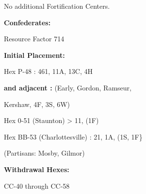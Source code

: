 \begin{scenariodata}
No additional Fortification Centers.\\
\end{scenariodata}

\begin{scenariodata}
\textbf{Confederates:}\\
\end{scenariodata}

\begin{scenariodata}
Resource Factor 714\\
\end{scenariodata}

\begin{scenariodata}
\textbf{Initial Placement:}\\
\end{scenariodata}

\begin{scenariodata}
Hex P-48 : 461, 11A, 13C, 4H\\
\end{scenariodata}

\begin{scenariodata}
\textbf{and adjacent :} (Early, Gordon, Ramseur,\\
\end{scenariodata}

Kershaw, 4F, 3S, 6W)

\begin{scenariodata}
Hex 0-51 (Staunton) > 11, (1F)\\
\end{scenariodata}

\begin{scenariodata}
Hex BB-53 (Charlottesville) : 21, 1A, (1S, 1F\}\\
\end{scenariodata}

\begin{scenariodata}
(Partisans: Mosby, Gilmor)\\
\end{scenariodata}

\begin{scenariodata}
\textbf{Withdrawal Hexes:}\\
\end{scenariodata}

\begin{scenariodata}
CC-40 through CC-58\\
\end{scenariodata}

